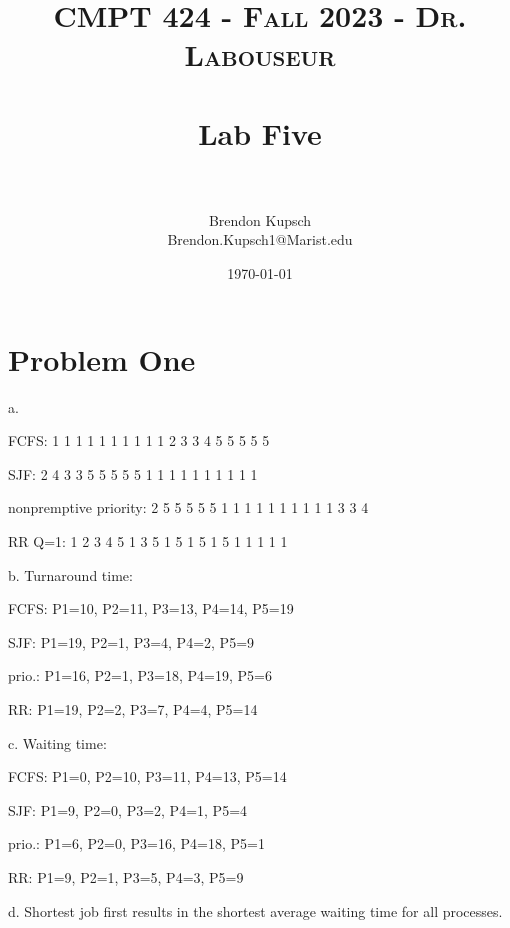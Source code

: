 \documentclass[letterpaper, 10pt,DIV=13]{scrartcl}
\title{	
   \normalfont \normalsize 
   \textsc{CMPT 424 - Fall 2023 - Dr. Labouseur} \\[10pt] %
   \horrule{0.5pt} \\[0.25cm] 	%
   \huge Lab Five  \\     	    %
   \horrule{0.5pt} \\[0.25cm] 	%
}
\author{Brendon Kupsch \\ \normalsize Brendon.Kupsch1@Marist.edu}
\date{\normalsize\today} 	%
\numberwithin{equation}{section} %
\numberwithin{figure}{section} %
\numberwithin{table}{section} %
\begin{document}
\maketitle %


\section{Problem One}
a.	

FCFS: 			1 1 1 1 1 1 1 1 1 1 2 3 3 4 5 5 5 5 5

SJF: 				2 4 3 3 5 5 5 5 5 1 1 1 1 1 1 1 1 1 1

nonpremptive priority: 	2 5 5 5 5 5 1 1 1 1 1 1 1 1 1 1 3 3 4

RR Q=1:			1 2 3 4 5 1 3 5 1 5 1 5 1 5 1 1 1 1 1

b. Turnaround time: 

	FCFS: P1=10, P2=11, P3=13, P4=14, P5=19

	SJF: 	P1=19, P2=1, P3=4, P4=2, P5=9

	prio.:	P1=16, P2=1, P3=18, P4=19, P5=6

	RR:	P1=19, P2=2, P3=7, P4=4, P5=14


c. Waiting time: 

	FCFS: P1=0, P2=10, P3=11, P4=13, P5=14

	SJF: 	P1=9, P2=0, P3=2, P4=1, P5=4

	prio.:	P1=6, P2=0, P3=16, P4=18, P5=1

	RR:	P1=9, P2=1, P3=5, P4=3, P5=9

d. Shortest job first results in the shortest average waiting time for all processes.



\end{document}
